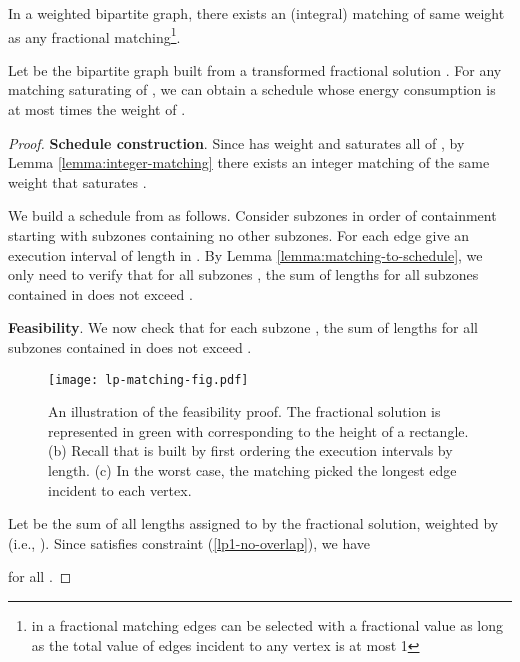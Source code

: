 \begin{lem}\label{lemma:integer-matching}\cite{Lovasz_Plummer_matching,Shmoys_Tardos}
  In a weighted bipartite graph, there exists an (integral) matching of same weight as any fractional matching\footnote{in a fractional matching edges can be selected with a fractional value as long as the total value of edges incident to any vertex is at most 1}.
\end{lem}

\begin{lem}\label{lemma:matching-to-schedule}
  Let  be the bipartite graph built from a transformed fractional solution .
  For any matching  saturating  of , we can obtain a schedule whose energy consumption is at most  times the weight of . \end{lem}
\begin{proof}

\textbf{Schedule construction}.
Since  has weight  and saturates all of , by Lemma \ref{lemma:integer-matching} there exists an integer matching  of the same weight that saturates .

We build a schedule  from  as follows. Consider subzones in order of containment starting with subzones containing no other subzones. For each edge  give  an execution interval of length  in . By Lemma \ref{lemma:matching-to-schedule}, we only need to verify that for all subzones , the sum of lengths for all subzones contained in  does not exceed .

\textbf{Feasibility}.
We now check that for each subzone , the sum of lengths for all subzones contained in  does not exceed .

\begin{figure}[ht!]
   \begin{center}
        \texttt{[image: lp-matching-fig.pdf]}
   \end{center}
   \caption{An illustration of the feasibility proof. The fractional solution is represented in green with  corresponding to the height of a rectangle. (b) Recall that  is built by first ordering the execution intervals by length. (c) In the worst case, the matching picked the longest edge incident to each vertex.}
   \label{fig:LP_matching}
\end{figure}

Let  be the sum of all lengths assigned to  by the fractional solution, weighted by  (i.e., ). Since  satisfies constraint (\ref{lp1-no-overlap}), we have

for all .




\end{proof}
